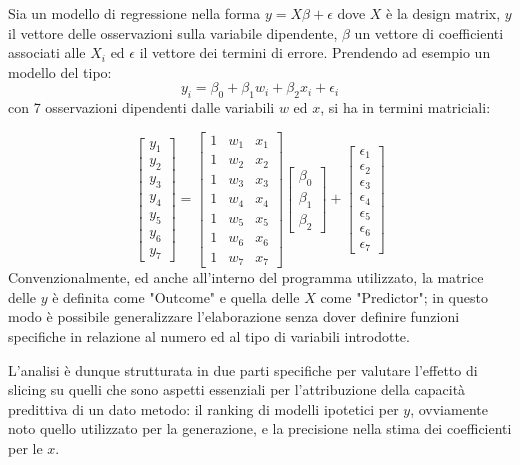 \documentclass[a4paper]{report}
\begin{document}
Sia un modello di regressione nella forma $y=X\beta+\epsilon$ dove $X$ è la design matrix, $y$ il vettore delle osservazioni sulla variabile dipendente, $\beta$ un vettore di coefficienti associati alle $X_i$ ed $\epsilon $ il vettore dei termini di errore.
Prendendo ad esempio un modello del tipo:
\[y_i = \beta_0 + \beta_1 w_i + \beta_2 x_i + \epsilon_i \]
con 7 osservazioni dipendenti dalle variabili $w$ ed $x$, si ha in termini matriciali:

\[\begin{bmatrix}y_1 \\ y_2 \\ y_3 \\ y_4 \\ y_5 \\ y_6 \\ y_7 \end{bmatrix} =
\begin{bmatrix} 1 & w_1 & x_1  \\1 & w_2 & x_2  \\1 & w_3 & x_3  \\1 & w_4 & x_4  \\1 & w_5 & x_5  \\1 & w_6 & x_6 \\ 1& w_7  & x_7  \end{bmatrix}
\begin{bmatrix} \beta_0 \\ \beta_1 \\ \beta_2  \end{bmatrix}
+
\begin{bmatrix} \epsilon_1 \\ \epsilon_2 \\ \epsilon_3 \\ \epsilon_4 \\ \epsilon_5 \\ \epsilon_6 \\ \epsilon_7 \end{bmatrix}\]
Convenzionalmente, ed anche all'interno del programma utilizzato, la matrice delle $y$ è definita come "Outcome" e quella delle $X$ come "Predictor"; in questo modo è possibile generalizzare l'elaborazione senza dover definire funzioni specifiche in relazione al numero ed al tipo di variabili introdotte.

L'analisi è dunque strutturata in due parti specifiche per valutare l'effetto di slicing su quelli che sono aspetti essenziali per l'attribuzione della capacità predittiva di un dato metodo: il ranking di modelli ipotetici per $y$, ovviamente noto quello utilizzato per la generazione, e la precisione nella stima dei coefficienti per  le $x$.
\end{document}
